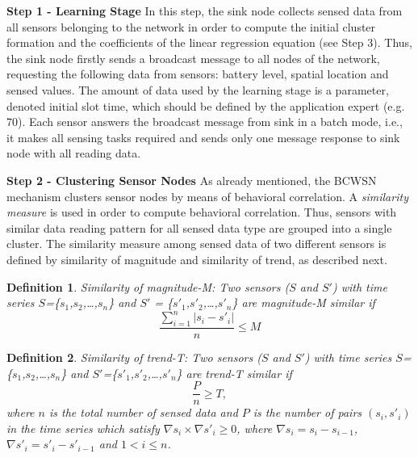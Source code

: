 \documentclass{acm_proc_article-sp}
\begin{document}
{\bf Step 1 - Learning Stage}
In this step, the sink node collects sensed data from all sensors belonging to
the network in order to compute the initial cluster formation and the
coefficients of the linear regression equation (see Step 3). Thus, the sink 
node firstly sends a broadcast message to all
nodes of the network, requesting the following data from sensors:
battery level, spatial location and sensed values. The amount of data used by the
learning stage is a parameter, denoted initial slot time, which should be
defined by the application expert (e.g. 70). Each sensor answers the broadcast
message from sink in a batch mode, i.e., it makes all sensing tasks required and
sends only one message response to sink node with all reading data.
\vspace*{-.3cm}

{\bf Step 2 - Clustering Sensor Nodes}
As already mentioned, the BCWSN mechanism clusters sensor nodes by means of
behavioral correlation. A \textit{similarity measure} \cite{Liu2007} is used in
order to compute behavioral correlation. Thus, sensors with similar data reading
pattern for all sensed data type are grouped into a single cluster.
The similarity measure among sensed data of two different sensors is defined by
similarity of magnitude and similarity of trend, as described next.
\vspace*{-.3cm}

\newtheorem{defini}{Definition}

\begin{defini}
Similarity of magnitude-M: Two sensors ($S$ and $S'$) with time series
$S$=\{$s_{1}$,$s_{2}$,\ldots,$s_{n}$\} and
$S'$ = \{$s'_{1}$,$s'_{2}$,\ldots,$s'_{n}$\} are magnitude-M similar if 
\begin{equation}
\label{equ:magni}
\frac{\sum_{i=1}^{n} |s_{i}-s'_{i}|}{n} \leq M
\end{equation}
\end{defini}
\vspace*{-.3cm}

\begin{defini}
Similarity of trend-T: Two sensors ($S$ and $S'$) with time series
$S$=\{$s_{1}$,$s_{2}$,\ldots,$s_{n}$\} and
$S'$=\{$s'_{1}$,$s'_{2}$,\ldots,$s'_{n}$\} are trend-T similar if 
\begin{equation}
\label{equ:trend}
\frac{P}{n} \geq T,
\end{equation}
where $n$ is the total number of sensed data and $P$ is the number of pairs
$(s_{i},s'_{i})$ in the time series which satisfy $\nabla s_{i} \times \nabla
s'_{i} \geq 0$, where $\nabla s_{i} = s_{i} - s_{i-1}$, $\nabla
s'_{i} = s'_{i} - s'_{i-1}$ and $1 < i \leq n$.
\end{defini}
\vspace*{-.3cm}
\end{document}
